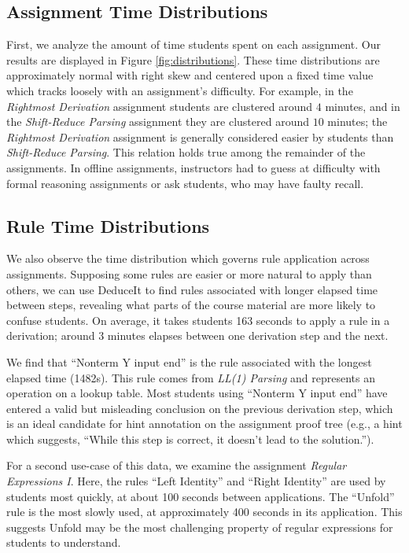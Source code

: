 \documentclass{sigchi}
\begin{document}
\subsection{Assignment Time Distributions}

First, we analyze the amount of time students spent on each assignment. Our results are displayed in Figure \ref{fig:distributions}. These time distributions are approximately normal with right skew and centered upon a fixed time value which tracks loosely with an assignment's difficulty. For example, in the \textit{Rightmost Derivation} assignment students are clustered around $4$ minutes, and in the \textit{Shift-Reduce Parsing} assignment they are clustered around $10$ minutes; the \textit{Rightmost Derivation} assignment is generally considered easier by students than \textit{Shift-Reduce Parsing}. This relation holds true among the remainder of the assignments. In offline assignments, instructors had to guess at difficulty with formal reasoning assignments or ask students, who may have faulty recall. %

\subsection{Rule Time Distributions}

We also observe the time distribution which governs rule application across assignments. Supposing some rules are easier or more natural to apply than others, we can use DeduceIt to find rules associated with longer elapsed time between steps, revealing what parts of the course material are more likely to confuse students. On average, it takes students 163 seconds to apply a rule in a derivation; around 3 minutes elapses between one derivation step and the next. 

We find that ``Nonterm Y input end'' is the rule associated with the longest elapsed time (1482s). This rule comes from \textit{LL(1) Parsing} and represents an operation on a lookup table. Most students using ``Nonterm Y input end'' have entered a valid but misleading conclusion on the previous derivation step, which is an ideal candidate for hint annotation on the assignment proof tree (e.g., a hint which suggests, ``While this step is correct, it doesn't lead to the solution.''). %

For a second use-case of this data, we examine the assignment \textit{Regular Expressions I}. Here, the rules ``Left Identity'' and ``Right Identity'' are used by students most quickly, at about 100 seconds between applications. The ``Unfold'' rule is the most slowly used, at approximately 400 seconds in its application. This suggests Unfold may be the most challenging property of regular expressions for students to understand. 
\end{document}
